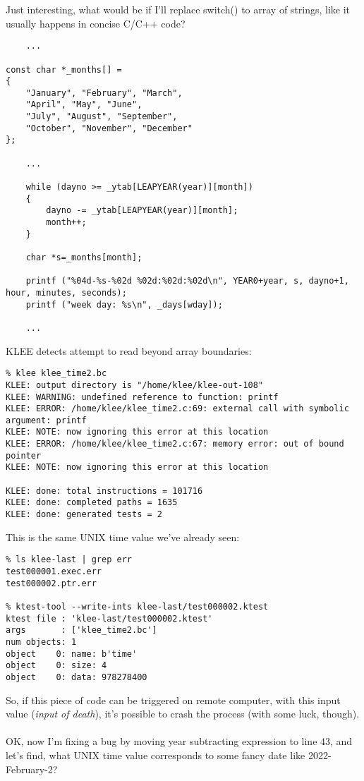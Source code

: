 Just interesting, what would be if I'll replace switch() to array of strings, like it usually happens in concise C/C++ code?

\begin{lstlisting}
	...

const char *_months[] =
{
	"January", "February", "March",
	"April", "May", "June",
	"July", "August", "September",
	"October", "November", "December"
};

	...

	while (dayno >= _ytab[LEAPYEAR(year)][month])
	{
		dayno -= _ytab[LEAPYEAR(year)][month];
		month++;
	}
	
	char *s=_months[month];

	printf ("%04d-%s-%02d %02d:%02d:%02d\n", YEAR0+year, s, dayno+1, hour, minutes, seconds);
	printf ("week day: %s\n", _days[wday]);	
	
	...

\end{lstlisting}

KLEE detects attempt to read beyond array boundaries:

\begin{lstlisting}
% klee klee_time2.bc
KLEE: output directory is "/home/klee/klee-out-108"
KLEE: WARNING: undefined reference to function: printf
KLEE: ERROR: /home/klee/klee_time2.c:69: external call with symbolic argument: printf
KLEE: NOTE: now ignoring this error at this location
KLEE: ERROR: /home/klee/klee_time2.c:67: memory error: out of bound pointer
KLEE: NOTE: now ignoring this error at this location

KLEE: done: total instructions = 101716
KLEE: done: completed paths = 1635
KLEE: done: generated tests = 2
\end{lstlisting}

This is the same UNIX time value we've already seen:

\begin{lstlisting}
% ls klee-last | grep err
test000001.exec.err
test000002.ptr.err

% ktest-tool --write-ints klee-last/test000002.ktest
ktest file : 'klee-last/test000002.ktest'
args       : ['klee_time2.bc']
num objects: 1
object    0: name: b'time'
object    0: size: 4
object    0: data: 978278400
\end{lstlisting}

So, if this piece of code can be triggered on remote computer, with this input value (\emph{input of death}),
it's possible to crash the process (with some luck, though).\\
\\
OK, now I'm fixing a bug by moving year subtracting expression to line 43, and let's find, what UNIX time value corresponds to some fancy date
like 2022-February-2?

